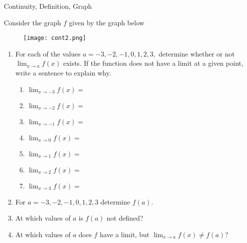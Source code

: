 \begin{tagblock}{Continuity, Definition, Graph}
\begin{question}
	
	Consider the graph $f$ given by the graph below
\begin{figure}[h]
\centering
\texttt{[image: cont2.png]}
\end{figure}

\begin{enumerate}

\item For each of the values $a=-3,-2,-1,0,1,2,3,$ determine whether or not $\lim_{x \to a} f(x)$ exists.  If the function does not have a limit at a given point, write a sentence to explain why.
\begin{enumerate}
\item  $\displaystyle \lim_{x \to -3} f(x)=$ 

\bigskip

\item  $\displaystyle \lim_{x \to -2} f(x)=$ 

\bigskip


\item  $\displaystyle \lim_{x \to -1} f(x)=$ 

\bigskip

\item  $\displaystyle \lim_{x \to 0} f(x)=$ 

\bigskip

\item  $\displaystyle \lim_{x \to 1} f(x)=$ 

\bigskip

\item  $\displaystyle \lim_{x \to 2} f(x)=$ 

\bigskip

\item  $\displaystyle \lim_{x \to 3} f(x)=$ 

\bigskip

\end{enumerate}

\item For $a=-3,-2,-1,0,1,2,3$ determine $f(a)$.  
\vspace{.75in}

\item At which values of $a$ is $f(a)$ not defined?
\vspace{.75in}


\item At which values of $a$ does $f$ have a limit, but $\lim_{x \to a} f(x) \neq f(a) $?
\vspace{.75in}


\end{enumerate}
\end{question}
\end{tagblock}
